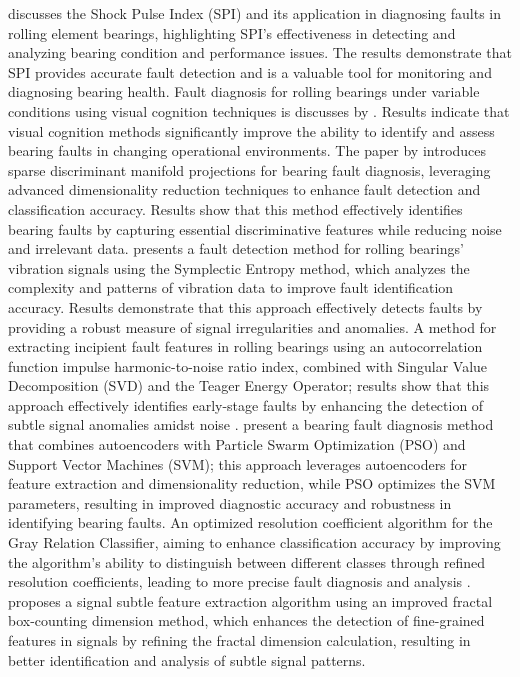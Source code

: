 \documentclass[sn-basic,pdflatex]{sn-jnl}
\theoremstyle{remark}
\theoremstyle{definition}
\begin{document}
\citet{WOS:000398818700108} discusses the Shock Pulse Index (SPI) and
its application in diagnosing faults in rolling element bearings,
highlighting SPI's effectiveness in detecting and analyzing bearing
condition and performance issues. The results demonstrate that SPI
provides accurate fault detection and is a valuable tool for monitoring
and diagnosing bearing health. Fault diagnosis for rolling bearings
under variable conditions using visual cognition techniques is discusses
by \citet{WOS:000404415000016}. Results indicate that visual cognition
methods significantly improve the ability to identify and assess bearing
faults in changing operational environments. The paper by
\citet{WOS:000401109400020} introduces sparse discriminant manifold
projections for bearing fault diagnosis, leveraging advanced
dimensionality reduction techniques to enhance fault detection and
classification accuracy. Results show that this method effectively
identifies bearing faults by capturing essential discriminative features
while reducing noise and irrelevant data. \citet{WOS:000419006900041}
presents a fault detection method for rolling bearings' vibration
signals using the Symplectic Entropy method, which analyzes the
complexity and patterns of vibration data to improve fault
identification accuracy. Results demonstrate that this approach
effectively detects faults by providing a robust measure of signal
irregularities and anomalies. A method for extracting incipient fault
features in rolling bearings using an autocorrelation function impulse
harmonic-to-noise ratio index, combined with Singular Value
Decomposition (SVD) and the Teager Energy Operator; results show that
this approach effectively identifies early-stage faults by enhancing the
detection of subtle signal anomalies amidst noise
\citep{WOS:000416794600016}. \citet{WOS:000484465800028} present a
bearing fault diagnosis method that combines autoencoders with Particle
Swarm Optimization (PSO) and Support Vector Machines (SVM); this
approach leverages autoencoders for feature extraction and
dimensionality reduction, while PSO optimizes the SVM parameters,
resulting in improved diagnostic accuracy and robustness in identifying
bearing faults. An optimized resolution coefficient algorithm for the
Gray Relation Classifier, aiming to enhance classification accuracy by
improving the algorithm's ability to distinguish between different
classes through refined resolution coefficients, leading to more precise
fault diagnosis and analysis \citep{WOS:000477760600037}.
\citet{WOS:000477760600061} proposes a signal subtle feature extraction
algorithm using an improved fractal box-counting dimension method, which
enhances the detection of fine-grained features in signals by refining
the fractal dimension calculation, resulting in better identification
and analysis of subtle signal patterns.
\end{document}
